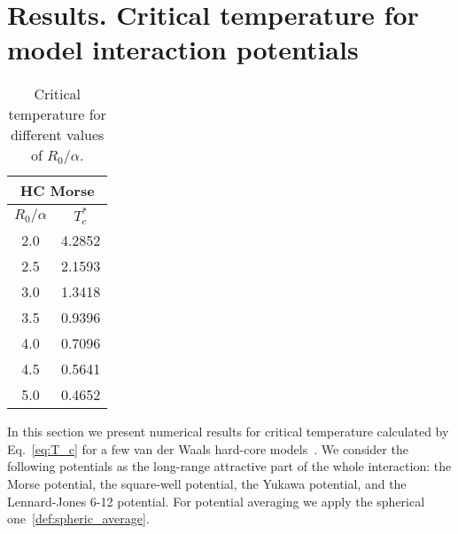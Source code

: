 \section{\label{sec:results}Results. Critical temperature for model interaction potentials}

\begin{table}[h]
	\noindent\caption{Critical temperature for different values of $R_0/\alpha$.}\vskip3mm
	\begin{tabular}{|c|c|}
		\hline
		\multicolumn{2}{|c|}{HC Morse} \\
		\hline
		$R_0/\alpha$ \quad & $T_c^*$ \\
		\hline
		2.0  & 4.2852 \\
		2.5  & 2.1593 \\
		3.0  & 1.3418 \\
		3.5  & 0.9396 \\
		4.0  & 0.7096 \\
		4.5  & 0.5641 \\
		5.0  & 0.4652 \\
		\hline
	\end{tabular}
	\label{tab:morse_temp_cr}
\end{table}

In this section we present numerical results for critical temperature calculated by Eq.~\eqref{eq:T_c} for a few van der Waals hard-core models~\cite{KreiciNezbeda2012}. We consider the following potentials as the long-range attractive part of the whole interaction: the Morse potential, the square-well potential, the Yukawa potential, and the Lennard-Jones 6-12 potential. For potential averaging we apply the spherical one~\eqref{def:spheric_average}.

